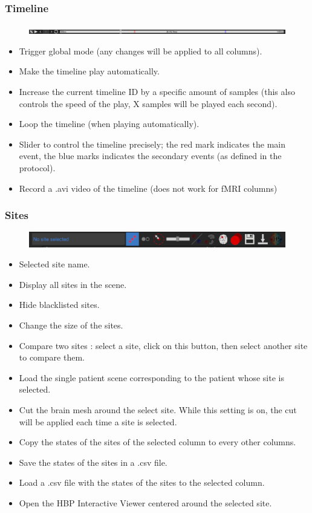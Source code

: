 \documentclass[a4paper]{article}
\begin{document}
\subsubsection{Timeline}
\begin{figure}[H]
\begin{center}
\includegraphics[scale=0.3]{Timeline.png}
\end{center}
\end{figure}
\begin{itemize}
\item Trigger global mode (any changes will be applied to all columns).
\item Make the timeline play automatically.
\item Increase the current timeline ID by a specific amount of samples (this also controls the speed of the play, X samples will be played each second).
\item Loop the timeline (when playing automatically).
\item Slider to control the timeline precisely; the red mark indicates the main event, the blue marks indicates the secondary events (as defined in the protocol).
\item Record a .avi video of the timeline (does not work for fMRI columns)
\end{itemize}
\subsubsection{Sites}
\begin{figure}[H]
\begin{center}
\includegraphics[scale=0.5]{Sites.png}
\end{center}
\end{figure}
\begin{itemize}
\item Selected site name.
\item Display all sites in the scene.
\item Hide blacklisted sites.
\item Change the size of the sites.
\item Compare two sites : select a site, click on this button, then select another site to compare them.
\item Load the single patient scene corresponding to the patient whose site is selected.
\item Cut the brain mesh around the select site. While this setting is on, the cut will be applied each time a site is selected.
\item Copy the states of the sites of the selected column to every other columns.
\item Save the states of the sites in a .csv file.
\item Load a .csv file with the states of the sites to the selected column.
\item Open the HBP Interactive Viewer centered around the selected site.
\end{itemize}
\end{document}
